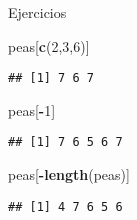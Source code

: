 \documentclass[ignorenonframetext,]{beamer}
\newenvironment{Shaded}{\begin{snugshade}}{\end{snugshade}}
\newcommand{\KeywordTok}[1]{\textcolor[rgb]{0.13,0.29,0.53}{\textbf{#1}}}
\newcommand{\DecValTok}[1]{\textcolor[rgb]{0.00,0.00,0.81}{#1}}
\newcommand{\OperatorTok}[1]{\textcolor[rgb]{0.81,0.36,0.00}{\textbf{#1}}}
\newcommand{\NormalTok}[1]{#1}
\begin{document}
\begin{frame}[fragile]{Ejercicios}

\begin{Shaded}
\begin{Highlighting}[]
\NormalTok{peas[}\KeywordTok{c}\NormalTok{(}\DecValTok{2}\NormalTok{,}\DecValTok{3}\NormalTok{,}\DecValTok{6}\NormalTok{)]}
\end{Highlighting}
\end{Shaded}
\pause
\begin{verbatim}
## [1] 7 6 7
\end{verbatim}

\begin{Shaded}
\begin{Highlighting}[]
\NormalTok{peas[}\OperatorTok{-}\DecValTok{1}\NormalTok{]}
\end{Highlighting}
\end{Shaded}
\pause
\begin{verbatim}
## [1] 7 6 5 6 7
\end{verbatim}

\begin{Shaded}
\begin{Highlighting}[]
\NormalTok{peas[}\OperatorTok{-}\KeywordTok{length}\NormalTok{(peas)]}
\end{Highlighting}
\end{Shaded}
\pause
\begin{verbatim}
## [1] 4 7 6 5 6
\end{verbatim}

\end{frame}
\end{document}
